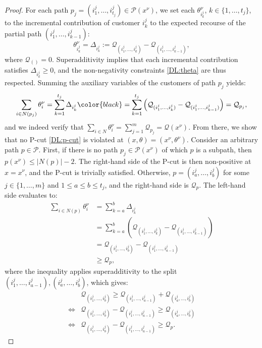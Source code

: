\documentclass{article}
\newcommand{\rev}[1]{{\color{black}#1}}
\begin{document}
\begin{proof}
For each path $p_j=(i^{j}_{1},\dots,i^{j}_{t_j}) \in \mathcal{P}(x^{\nu})$, we set each $\theta^{\nu}_{i^j_k}$, $k \in \{1,\dots,t_j\}$, to the incremental contribution of customer $i^j_k$ to the expected recourse of the partial path $(i^j_{1},\dots,i^j_{k-1})$:
\[
    \theta^{\nu}_{i^{j}_{k}} = \Delta_{i^{j}_{k}}
      := \mathcal{Q}_{(i^{j}_{1},\dots,i^{j}_{k})}
         -\mathcal{Q}_{(i^{j}_{1},\dots,i^{j}_{k-1})},
\]
where $\mathcal{Q}_{()} = 0$. Superadditivity implies that each incremental contribution satisfies $\Delta_{i^{j}_{k}} \geq 0$, and the non-negativity constraints \eqref{DL:theta} are thus respected. \rev{Summing the auxiliary variables of the customers of path $p_j$} yields:
\[
    \sum_{i\in N(p_j)}\theta^{\nu}_i
      = \sum_{k=1}^{t_j}\Delta_{i^{j}_{k}}
      \rev{= \sum_{k=1}^{t_j} \left( \mathcal{Q}_{(i^{j}_{1},\dots,i^{j}_{k})}
         -\mathcal{Q}_{(i^{j}_{1},\dots,i^{j}_{k-1})} \right) } 
      = \mathcal{Q}_{p_j},
\]
and we indeed verify that $\sum_{i \in N} \theta^{\nu}_i = \sum_{j=1}^m \mathcal{Q}_{p_j} = \mathcal{Q}(x^{\nu})$. From there, we show that no P-cut \eqref{DL:p-cut} is violated at $(x,\theta) = (x^{\nu},\theta^{\nu})$. Consider an arbitrary path $p \in \mathcal{P}$. First, if there is no path $p_j \in \mathcal{P}(x^{\nu})$ of which $p$ is a subpath, then $p(x^{\nu})\leq |N(p)|-2$. The right-hand side of the P-cut is then non-positive at $x=x^{\nu}$, and the P-cut is trivially satisfied. Otherwise, $p=(i^j_a,\dots,i^j_b)$ for some $j \in \{1,\dots,m\}$ and $1 \leq a \leq b \leq t_j$, and the right-hand side is $\mathcal{Q}_p$. The left-hand side evaluates to:
\begingroup
\allowdisplaybreaks
\begin{align*}
    \sum_{i \in N(p)} \theta^{\nu}_i &= \sum_{k=a}^b \Delta_{i^{j}_{k}}\\
    &= \sum_{k=a}^b \left(\mathcal{Q}_{(i^{j}_{1},\dots,i^{j}_{k})} -\mathcal{Q}_{(i^{j}_{1},\dots,i^{j}_{k-1})}\right)\\
    &= \mathcal{Q}_{(i^{j}_{1},\dots,i^{j}_{b})} -\mathcal{Q}_{(i^{j}_{1},\dots,i^{j}_{a-1})} \\
    &\geq \mathcal{Q}_{p},
\end{align*}
\endgroup
where the inequality applies superadditivity to the split $(i^{j}_{1},\dots,i^{j}_{a-1}), (i^{j}_{a},\dots,i^{j}_{b})$, which gives:
\begin{align*}
    & \mathcal{Q}_{(i^j_1, \dots, i^j_b)} \geq \mathcal{Q}_{(i^{j}_{1},\dots,i^{j}_{a-1})} + \mathcal{Q}_{(i^{j}_{a},\dots,i^{j}_{b})}\\
    \iff & \mathcal{Q}_{(i^j_1, \dots, i^j_b)} - \mathcal{Q}_{(i^{j}_{1},\dots,i^{j}_{a-1})} \geq \mathcal{Q}_{(i^{j}_{a},\dots,i^{j}_{b})} \\
    \iff & \mathcal{Q}_{(i^j_1, \dots, i^j_b)} - \mathcal{Q}_{(i^{j}_{1},\dots,i^{j}_{a-1})} \geq \mathcal{Q}_{p}.
\end{align*}


\end{proof}
\end{document}
